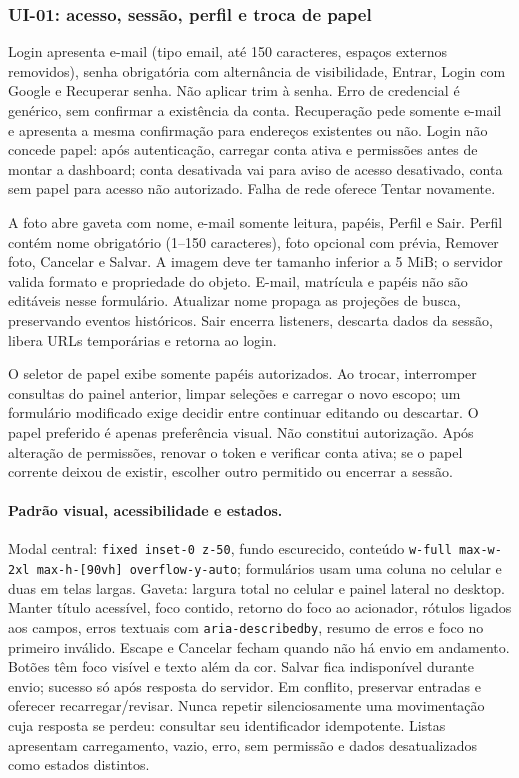 \subsubsection{UI-01: acesso, sessão, perfil e troca de papel}
Login apresenta e-mail (tipo email, até 150 caracteres, espaços externos removidos), senha obrigatória com alternância de visibilidade, Entrar, Login com Google e Recuperar senha. Não aplicar trim à senha. Erro de credencial é genérico, sem confirmar a existência da conta. Recuperação pede somente e-mail e apresenta a mesma confirmação para endereços existentes ou não. Login não concede papel: após autenticação, carregar conta ativa e permissões antes de montar a dashboard; conta desativada vai para aviso de acesso desativado, conta sem papel para acesso não autorizado. Falha de rede oferece Tentar novamente.

A foto abre gaveta com nome, e-mail somente leitura, papéis, Perfil e Sair. Perfil contém nome obrigatório (1--150 caracteres), foto opcional com prévia, Remover foto, Cancelar e Salvar. A imagem deve ter tamanho inferior a 5 MiB; o servidor valida formato e propriedade do objeto. E-mail, matrícula e papéis não são editáveis nesse formulário. Atualizar nome propaga as projeções de busca, preservando eventos históricos. Sair encerra listeners, descarta dados da sessão, libera URLs temporárias e retorna ao login.

O seletor de papel exibe somente papéis autorizados. Ao trocar, interromper consultas do painel anterior, limpar seleções e carregar o novo escopo; um formulário modificado exige decidir entre continuar editando ou descartar. O papel preferido é apenas preferência visual. Não constitui autorização. Após alteração de permissões, renovar o token e verificar conta ativa; se o papel corrente deixou de existir, escolher outro permitido ou encerrar a sessão.

\paragraph{Padrão visual, acessibilidade e estados.}
Modal central: \texttt{fixed inset-0 z-50}, fundo escurecido, conteúdo \texttt{w-full max-w-2xl max-h-[90vh] overflow-y-auto}; formulários usam uma coluna no celular e duas em telas largas. Gaveta: largura total no celular e painel lateral no desktop. Manter título acessível, foco contido, retorno do foco ao acionador, rótulos ligados aos campos, erros textuais com \texttt{aria-describedby}, resumo de erros e foco no primeiro inválido. Escape e Cancelar fecham quando não há envio em andamento. Botões têm foco visível e texto além da cor. Salvar fica indisponível durante envio; sucesso só após resposta do servidor. Em conflito, preservar entradas e oferecer recarregar/revisar. Nunca repetir silenciosamente uma movimentação cuja resposta se perdeu: consultar seu identificador idempotente. Listas apresentam carregamento, vazio, erro, sem permissão e dados desatualizados como estados distintos.

